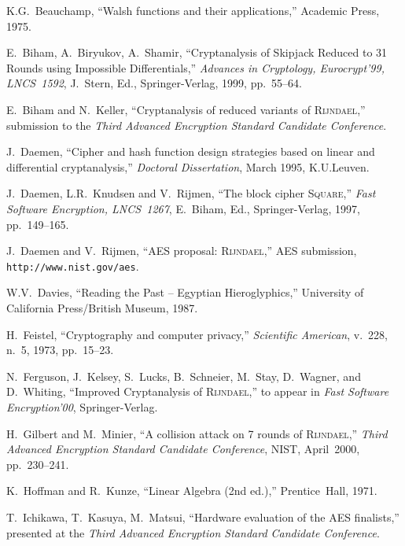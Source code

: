 \documentclass{llncs}
\begin{document}
\begin{thebibliography}{99}

K.G.~Beauchamp, ``Walsh functions and their
applications,'' Academic Press, 1975.

E.~Biham, A.~Biryukov, A.~Shamir,
``Cryptanalysis of Skipjack Reduced to 31 Rounds using Impossible
Differentials,'' \emph{Advances in Cryptology, Eurocrypt'99,
LNCS~1592}, J.~Stern, Ed., Springer-Verlag, 1999, pp.~55--64.

E.~Biham and N.~Keller, ``Cryptanalysis of
reduced variants of \textsc{\mbox{Rijndael}},'' submission to the
\emph{Third Advanced Encryption Standard Candidate Conference}.

J.~Daemen, ``Cipher and hash function design
strategies based on linear and differential cryptanalysis,''
\emph{Doctoral Dissertation}, March 1995, K.U.Leuven.

J.~Daemen, L.R.~Knudsen and V.~Rijmen,
``The block cipher \textsc{\mbox{Square}},'' \emph{Fast Software
Encryption, LNCS~1267}, E.~Biham, Ed., Springer-Verlag, 1997,
pp.~149--165.

J.~Daemen and V.~Rijmen, ``AES proposal:
\textsc{\mbox{Rijndael}},'' AES submission, {\tt
http://www.nist.gov/aes}.

W.V.~Davies, ``Reading the Past -- Egyptian
Hieroglyphics,'' University of California Press/British Museum,
1987.

H.~Feistel, ``Cryptography and computer privacy,''
\emph{Scientific American}, v.~228, n.~5, 1973, pp.~15--23.

N.~Ferguson, J.~Kelsey, S.~Lucks,
B.~Schneier, M.~Stay, D.~Wagner, and D.~Whiting, ``Improved
Cryptanalysis of \textsc{\mbox{Rijndael}},'' to appear in
\emph{Fast Software Encryption'00}, Springer-Verlag.

H.~Gilbert and M.~Minier, ``A collision
attack on 7 rounds of \textsc{\mbox{Rijndael}},'' \emph{Third
Advanced Encryption Standard Candidate Conference}, NIST,
April~2000, pp.~230--241.

K.~Hoffman and R.~Kunze, ``Linear
Algebra (2nd ed.),'' Prentice~Hall, 1971.

 T.~Ichikawa, T.~Kasuya, M.~Matsui,
``Hardware evaluation of the AES finalists,'' presented at the \emph{Third
Advanced Encryption Standard Candidate Conference}.


\end{thebibliography}
\end{document}
